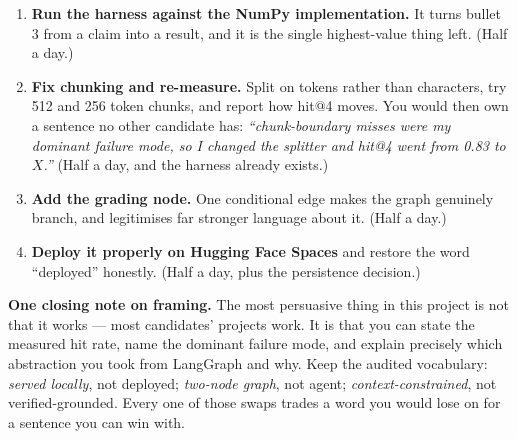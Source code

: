 \documentclass[11pt,a4paper]{article}
\begin{document}
\begin{enumerate}[leftmargin=*]
  \item \textbf{Run the harness against the NumPy implementation.} It turns
        bullet 3 from a claim into a result, and it is the single highest-value
        thing left. (Half a day.)
  \item \textbf{Fix chunking and re-measure.} Split on tokens rather than
        characters, try 512 and 256 token chunks, and report how hit@4 moves. You
        would then own a sentence no other candidate has: \emph{``chunk-boundary
        misses were my dominant failure mode, so I changed the splitter and hit@4
        went from 0.83 to $X$.''} (Half a day, and the harness already exists.)
  \item \textbf{Add the grading node.} One conditional edge makes the graph
        genuinely branch, and legitimises far stronger language about it.
        (Half a day.)
  \item \textbf{Deploy it properly on Hugging Face Spaces} and restore the word
        ``deployed'' honestly. (Half a day, plus the persistence decision.)
\end{enumerate}

\vspace{1em}
\noindent
\textbf{One closing note on framing.} The most persuasive thing in this project is
not that it works --- most candidates' projects work. It is that you can state the
measured hit rate, name the dominant failure mode, and explain precisely which
abstraction you took from LangGraph and why. Keep the audited vocabulary:
\emph{served locally}, not deployed; \emph{two-node graph}, not agent;
\emph{context-constrained}, not verified-grounded. Every one of those swaps trades
a word you would lose on for a sentence you can win with.
\end{document}

